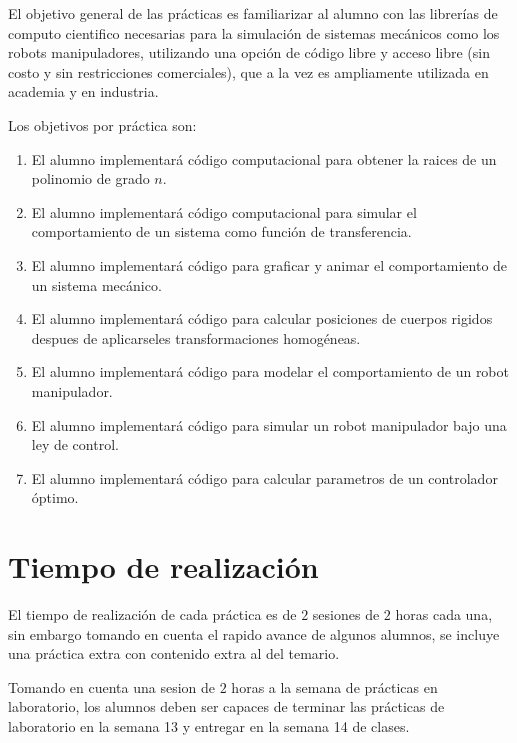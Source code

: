 	El objetivo general de las prácticas es familiarizar al alumno con las librerías de computo cientifico necesarias para la simulación de sistemas mecánicos como los robots manipuladores, utilizando una opción de código libre y acceso libre (sin costo y sin restricciones comerciales), que a la vez es ampliamente utilizada en academia y en industria.

	Los objetivos por práctica son:

	\begin{enumerate}
		\item El alumno implementará código computacional para obtener la raices de un polinomio de grado $n$.
		\item El alumno implementará código computacional para simular el comportamiento de un sistema como función de transferencia.
		\item El alumno implementará código para graficar y animar el comportamiento de un sistema mecánico.
		\item El alumno implementará código para calcular posiciones de cuerpos rigidos despues de aplicarseles transformaciones homogéneas.
		\item El alumno implementará código para modelar el comportamiento de un robot manipulador.
		\item El alumno implementará código para simular un robot manipulador bajo una ley de control.
		\item El alumno implementará código para calcular parametros de un controlador óptimo.
	\end{enumerate}


\section{Tiempo de realización}

	El tiempo de realización de cada práctica es de $2$ sesiones de $2$ horas cada una, sin embargo tomando en cuenta el rapido avance de algunos alumnos, se incluye una práctica extra con contenido extra al del temario.

	Tomando en cuenta una sesion de $2$ horas a la semana de prácticas en laboratorio, los alumnos deben ser capaces de terminar las prácticas de laboratorio en la semana 13 y entregar en la semana 14 de clases.

